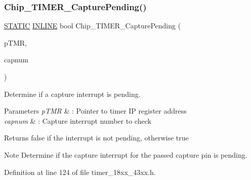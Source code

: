 \subsubsection{\texorpdfstring{Chip\+\_\+\+T\+I\+M\+E\+R\+\_\+\+Capture\+Pending()}{Chip\_TIMER\_CapturePending()}}
{\footnotesize\ttfamily \hyperlink{group___l_p_c___types___public___macros_ga10b2d890d871e1489bb02b7e70d9bdfb}{S\+T\+A\+T\+IC} \hyperlink{spifi__18xx__43xx_8h_a2eb6f9e0395b47b8d5e3eeae4fe0c116}{I\+N\+L\+I\+NE} bool Chip\+\_\+\+T\+I\+M\+E\+R\+\_\+\+Capture\+Pending (\begin{DoxyParamCaption}\item[{\hyperlink{struct_l_p_c___t_i_m_e_r___t}{L\+P\+C\+\_\+\+T\+I\+M\+E\+R\+\_\+T} $\ast$}]{p\+T\+MR,  }\item[{int8\+\_\+t}]{capnum }\end{DoxyParamCaption})}



Determine if a capture interrupt is pending. 


\begin{DoxyParams}{Parameters}
{\em p\+T\+MR} & \+: Pointer to timer IP register address \\
\hline
{\em capnum} & \+: Capture interrupt number to check \\
\hline
\end{DoxyParams}
\begin{DoxyReturn}{Returns}
false if the interrupt is not pending, otherwise true 
\end{DoxyReturn}
\begin{DoxyNote}{Note}
Determine if the capture interrupt for the passed capture pin is pending. 
\end{DoxyNote}


Definition at line 124 of file timer\+\_\+18xx\+\_\+43xx.\+h.

\mbox{\label{group___t_i_m_e_r__18_x_x__43_x_x_ga25bcfd101f052ee941da5bae28d84fcd}} 
